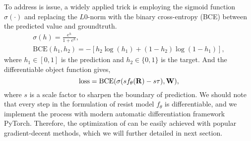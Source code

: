  To address is issue, a widely applied trick is employing the sigmoid function $\sigma(\cdot)$ and replacing the $L0$-norm with the binary cross-entropy (BCE) between the predicted value and groundtruth.
\begin{gather*}
        \sigma(h) = \frac{e^h}{1+e^h}, \\
        \text{BCE}(h_1, h_2)= -[h_2\log(h_1) + (1-h_2)\log(1-h_1)],
\end{gather*}
where $h_1\in[0,1]$ is the prediction and $h_2\in\{0,1\}$ is the target. And the differentiable object function gives,
\begin{equation}
    \text{loss} = \text{BCE}(\sigma(sf_\theta({\mathbf{R}}) - s\tau),{\mathbf{W}}), \label{eq:softobject}
\end{equation}
where $s$ is a scale factor to sharpen the boundary of prediction. We should note that every step in the formulation of resist model $f_\theta$ is differentiable, and we implement the process with modern automatic differentiation framework PyTorch\cite{paszke2019pytorch}. Therefore, the optimization of  can be easily achieved with popular gradient-decent methods, which we will further detailed in next section. 


